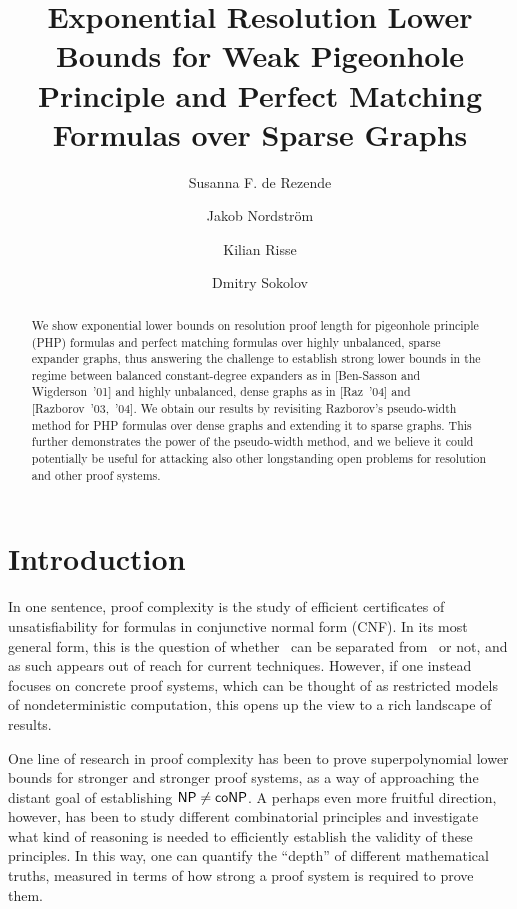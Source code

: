\documentclass{article}
\author{Susanna F. de Rezende \and Jakob Nordström \and Kilian Risse \and Dmitry Sokolov}\date{}
\title{Exponential 
  Resolution
  Lower Bounds for Weak Pigeonhole Principle 
  and Perfect Matching Formulas over Sparse Graphs}
\newcommand{\complclassformat}[1]{\textrm{\upshape{\textsf{#1}}}\xspace}
\newcommand{\cocomplclass}[1]{\textrm{\upshape{\textsf{co#1}}}\xspace}
\newcommand{\NP}{\complclassformat{NP}}
\newcommand{\coNP}{\cocomplclass{NP}}
\numberwithin{equation}{section}
\begin{document}
\maketitle







\begin{abstract}
  We show exponential lower bounds on resolution proof length for
  pigeonhole principle (PHP) formulas and perfect matching formulas
  over highly unbalanced, sparse expander graphs, thus answering the
  challenge to establish strong lower bounds in the regime between
  balanced constant-degree expanders as in [Ben-Sasson and
  Wigderson~'01] and highly unbalanced, dense graphs as in [Raz~'04]
  and [Razborov~'03,~'04].  We obtain our results by revisiting
  Razborov's pseudo-width method for PHP formulas over dense graphs
  and extending it to sparse graphs. This further demonstrates the
  power of the pseudo-width method, and we believe it could
  potentially be useful for attacking also other longstanding open
  problems for resolution and other proof systems.
\end{abstract}

\section{Introduction}
\label{sec:intro}

In one sentence, 
proof complexity 
is the study
of efficient certificates of unsatisfiability for formulas in
conjunctive normal form (CNF).  In its most general form, this is the
question of whether \coNP~can be separated from \NP~or not, and as
such appears out of reach for current techniques. 
However, if one instead focuses on concrete proof systems, which can
be thought of as restricted models of nondeterministic computation,
this opens up the view to a rich landscape of results.

One line of research in proof complexity has been to prove
superpolynomial lower bounds for stronger and stronger proof systems,
as a way of approaching 
the distant goal of establishing
$\NP \neq \coNP$. 
A perhaps even more fruitful direction, however, has been to study
different combinatorial principles and investigate what kind of
reasoning is needed to efficiently establish the validity of these
principles.  In this way, one can quantify the ``depth'' of
different mathematical truths, measured in terms of how strong a proof
system is required to prove them.
\end{document}

